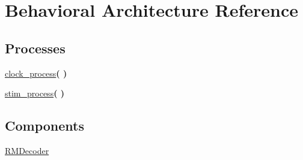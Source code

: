 \hypertarget{classtb___r_m_decoder_1_1_behavioral}{\section{Behavioral Architecture Reference}
\label{classtb___r_m_decoder_1_1_behavioral}
}
\subsection*{Processes}
 \begin{DoxyCompactItemize}
\item 
\hypertarget{classtb___r_m_decoder_1_1_behavioral_ac0731c1f0a226305f2a590b4044cdccb}{\hyperlink{classtb___r_m_decoder_1_1_behavioral_ac0731c1f0a226305f2a590b4044cdccb}{clock\+\_\+process}{\bfseries  (  )}}\label{classtb___r_m_decoder_1_1_behavioral_ac0731c1f0a226305f2a590b4044cdccb}

\item 
\hypertarget{classtb___r_m_decoder_1_1_behavioral_gaee7e8b077315d73d2c245522dd7ba9a8}{\hyperlink{group___r_m_decoder_gaee7e8b077315d73d2c245522dd7ba9a8}{stim\+\_\+process}{\bfseries  (  )}}\label{classtb___r_m_decoder_1_1_behavioral_gaee7e8b077315d73d2c245522dd7ba9a8}

\end{DoxyCompactItemize}
\subsection*{Components}
 \begin{DoxyCompactItemize}
\item 
\hypertarget{classtb___r_m_decoder_1_1_behavioral_gaa428b5ac9b6611fe96abf435a343d47c}{\hyperlink{group___r_m_decoder_gaa428b5ac9b6611fe96abf435a343d47c}{R\+M\+Decoder}  {\bfseries }  }\label{classtb___r_m_decoder_1_1_behavioral_gaa428b5ac9b6611fe96abf435a343d47c}

\end{DoxyCompactItemize}
